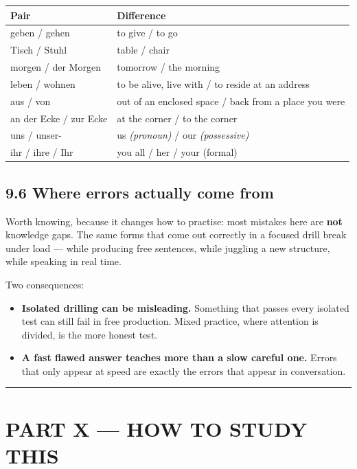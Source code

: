 \documentclass[
  11pt,
]{article}
\newcounter{none} %
\providecommand{\tightlist}{%
  \setlength{\itemsep}{0pt}\setlength{\parskip}{0pt}}
\begin{document}
{\def\LTcaptype{none} %
\begin{longtable}[]{@{}ll@{}}
\toprule\noalign{}
Pair & Difference \\
\midrule\noalign{}
\endhead
\bottomrule\noalign{}
\endlastfoot
geben / gehen & to give / to go \\
Tisch / Stuhl & table / chair \\
morgen / der Morgen & tomorrow / the morning \\
leben / wohnen & to be alive, live with / to reside at an address \\
aus / von & out of an enclosed space / back from a place you were \\
an der Ecke / zur Ecke & at the corner / to the corner \\
uns / unser- & us \emph{(pronoun)} / our \emph{(possessive)} \\
ihr / ihre / Ihr & you all / her / your (formal) \\
\end{longtable}
}

\subsection{9.6 Where errors actually come
from}\label{where-errors-actually-come-from}

Worth knowing, because it changes how to practise: most mistakes here
are \textbf{not} knowledge gaps. The same forms that come out correctly
in a focused drill break under load --- while producing free sentences,
while juggling a new structure, while speaking in real time.

Two consequences:

\begin{itemize}
\tightlist
\item
  \textbf{Isolated drilling can be misleading.} Something that passes
  every isolated test can still fail in free production. Mixed practice,
  where attention is divided, is the more honest test.
\item
  \textbf{A fast flawed answer teaches more than a slow careful one.}
  Errors that only appear at speed are exactly the errors that appear in
  conversation.
\end{itemize}

\begin{center}\rule{0.5\linewidth}{0.5pt}\end{center}

\section{PART X --- HOW TO STUDY THIS}\label{part-x-how-to-study-this}
\end{document}
